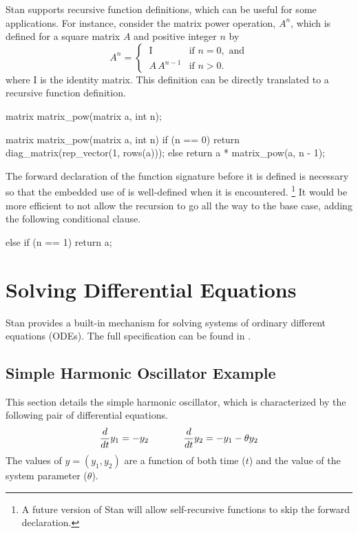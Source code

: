 Stan supports recursive function definitions, which can be useful for
some applications.  For instance, consider the matrix power operation,
$A^n$, which is defined for a square matrix $A$ and positive integer
$n$ by
\[
A^n 
=
\begin{cases}
\ \mbox{I} & \mbox{if } n = 0, \mbox{ and}
\\[3pt]
\ A \, A^{n-1} & \mbox{if } n > 0.
\end{cases}
\]
%
where $\mbox{I}$ is the identity matrix.  This definition can be
directly translated to a recursive function definition.
%
\begin{stancode}
  matrix matrix_pow(matrix a, int n);

  matrix matrix_pow(matrix a, int n) {
    if (n == 0)
      return diag_matrix(rep_vector(1, rows(a)));
    else 
      return a *  matrix_pow(a, n - 1);
  }
\end{stancode}
%
The forward declaration of the function signature before it is defined
is necessary so that the embedded use of  is
well-defined when it is encountered.%
%
\footnote{A future version of Stan will allow self-recursive functions
  to skip the forward declaration.}
%
It would be more efficient to not allow the recursion to go all the
way to the base case, adding the following conditional clause.
%
\begin{stancode}
    else if (n == 1)
      return a;
\end{stancode}



\chapter{Solving Differential Equations}\label{ode-solver.chapter}

\noindent
Stan provides a built-in mechanism for solving systems of ordinary
different equations (ODEs).  The full specification can be found in
.  


\section{Simple Harmonic Oscillator Example}

This section details the simple harmonic oscillator, which is
characterized by the following pair of 
differential equations.
%
\begin{equation}\label{ode-sho.equation}
\frac{d}{dt} y_1 = -y_2 
\hspace*{0.5in}
\frac{d}{dt} y_2 = -y_1 - \theta y_2
\end{equation}
%
The values of $y = (y_1,y_2)$ are a function of both time ($t$) and the
value of the system parameter ($\theta$).

